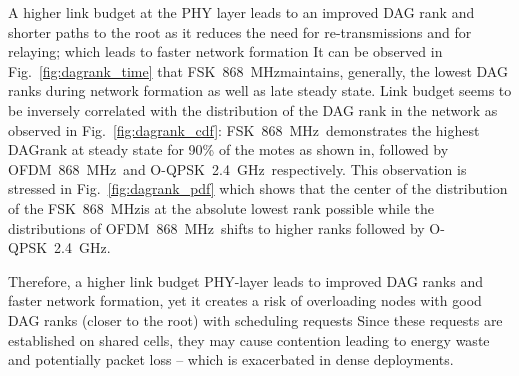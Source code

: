 \documentclass[sensors,article,submit,moreauthors,pdftex]{Definitions/mdpi}
\newcommand{\fsk}          {FSK~868~MHz}
\newcommand{\oqpsk}        {O-QPSK~2.4~GHz}
\newcommand{\ofdm}         {OFDM~868~MHz}
\begin{document}
A higher link budget at the PHY layer leads to an improved DAG rank and shorter paths to the root as it reduces the need for re-transmissions and for relaying; which leads to faster network formation
It can be observed in Fig.~\ref{fig:dagrank_time} that \fsk maintains, generally, the lowest DAG ranks during network formation as well as late steady state. 
Link budget seems to be inversely correlated with the distribution of the DAG rank in the network as observed in Fig.~\ref{fig:dagrank_cdf}: \fsk\ demonstrates the highest DAGrank at steady state for 90\% of the motes as shown in, followed by \ofdm\ and \oqpsk\ respectively.
This observation is stressed in Fig.~\ref{fig:dagrank_pdf} which shows that the center of the distribution of the \fsk is at the absolute lowest rank possible while the distributions of \ofdm\ shifts to higher ranks followed by \oqpsk. 


Therefore, a higher link budget PHY-layer leads to improved DAG ranks and faster network formation, yet it creates a risk of overloading nodes with good DAG ranks (closer to the root) with scheduling requests 
Since these requests are established on shared cells, they may cause contention leading to energy waste and potentially packet loss -- which is exacerbated in dense deployments.
\end{document}
